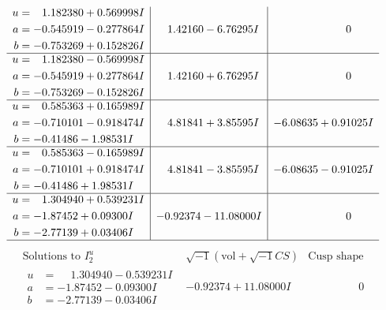 \documentclass[1p]{elsarticle_modified}
\theoremstyle{definition}
\newcommand{\I}{\sqrt{-1}}
\begin{document}
$$\begin{array}{c|c|c}
\begin{aligned}
u &= \phantom{-}1.182380 + 0.569998 I \\
a &= -0.545919 - 0.277864 I \\
b &= -0.753269 + 0.152826 I\end{aligned}
 & \phantom{-}1.42160 - 6.76295 I & \phantom{-0.000000 } 0 \\ \hline\begin{aligned}
u &= \phantom{-}1.182380 - 0.569998 I \\
a &= -0.545919 + 0.277864 I \\
b &= -0.753269 - 0.152826 I\end{aligned}
 & \phantom{-}1.42160 + 6.76295 I & \phantom{-0.000000 } 0 \\ \hline\begin{aligned}
u &= \phantom{-}0.585363 + 0.165989 I \\
a &= -0.710101 - 0.918474 I \\
b &= -0.41486 - 1.98531 I\end{aligned}
 & \phantom{-}4.81841 + 3.85595 I & -6.08635 + 0.91025 I \\ \hline\begin{aligned}
u &= \phantom{-}0.585363 - 0.165989 I \\
a &= -0.710101 + 0.918474 I \\
b &= -0.41486 + 1.98531 I\end{aligned}
 & \phantom{-}4.81841 - 3.85595 I & -6.08635 - 0.91025 I \\ \hline\begin{aligned}
u &= \phantom{-}1.304940 + 0.539231 I \\
a &= -1.87452 + 0.09300 I \\
b &= -2.77139 + 0.03406 I\end{aligned}
 & -0.92374 - 11.08000 I & \phantom{-0.000000 } 0\\
 \hline 
 \end{array}$$\newpage$$\begin{array}{c|c|c}  
\text{Solutions to }I^u_{2}& \I (\text{vol} + \sqrt{-1}CS) & \text{Cusp shape}\\
 \hline 
\begin{aligned}
u &= \phantom{-}1.304940 - 0.539231 I \\
a &= -1.87452 - 0.09300 I \\
b &= -2.77139 - 0.03406 I\end{aligned}
 & -0.92374 + 11.08000 I & \phantom{-0.000000 } 0 \\ \hline\begin{aligned}

\end{aligned}
\end{array}$$
\end{document}
